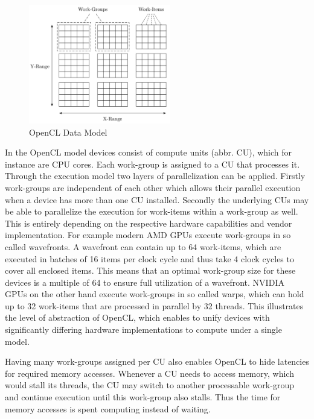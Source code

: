 \begin{figure}[!htb]	
	\includegraphics[width=0.55\textwidth]{drawings/opencl_data_model.pdf}
	\centering
	\caption{OpenCL Data Model}
	\label{img:opencl_data_model}
\end{figure}

In the OpenCL model devices consist of compute units (abbr. CU), which for instance are CPU cores. Each work-group is assigned to a CU that processes it. Through the execution model two layers of parallelization can be applied. Firstly work-groups are independent of each other which allows their parallel execution when a device has more than one CU installed. Secondly the underlying CUs may be able to parallelize the execution for work-items within a work-group as well. This is entirely depending on the respective hardware capabilities and vendor implementation. For example modern AMD GPUs execute work-groups in so called wavefronts. A wavefront can contain up to 64 work-items, which are executed in batches of 16 items per clock cycle and thus take 4 clock cycles to cover all enclosed items\cite{amd_opencl_spec}. This means that an optimal work-group size for these devices is a multiple of 64 to ensure full utilization of a wavefront.
NVIDIA GPUs on the other hand execute work-groups in so called warps, which can hold up to 32 work-items that are processed in parallel by 32 threads\cite{nvidia_pascal_spec}. This illustrates the level of abstraction of OpenCL, which enables to unify devices with significantly differing hardware implementations to compute under a single model.

Having many work-groups assigned per CU also enables OpenCL to hide latencies for required memory accesses. Whenever a CU needs to access memory, which would stall its threads, the CU may switch to another processable work-group and continue execution until this work-group also stalls. Thus the time for memory accesses is spent computing instead of waiting.

